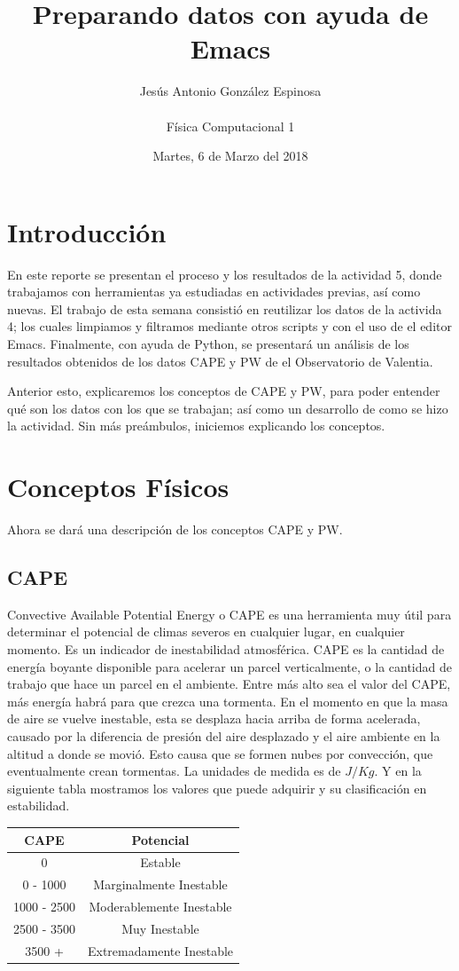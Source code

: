 \documentclass[a4paper]{article}
\title{Preparando datos con ayuda de Emacs}
\author{Jesús Antonio González Espinosa \\ \\ Física Computacional 1}
\date{Martes, 6 de Marzo del 2018}
\begin{document}
\maketitle

\section{Introducción}
En este reporte se presentan el proceso y los resultados de la actividad 5, donde trabajamos con herramientas ya estudiadas en actividades previas, así como nuevas. El trabajo de esta semana consistió en reutilizar los datos de la activida 4; los cuales limpiamos y filtramos mediante otros scripts y con el uso de el editor Emacs. Finalmente, con ayuda de Python, se presentará un análisis de los resultados obtenidos de los datos CAPE y PW de el Observatorio de Valentia.

Anterior  esto, explicaremos los conceptos de CAPE y PW, para poder entender qué son los datos con los que se trabajan; así como un desarrollo de como se hizo la actividad. Sin más preámbulos, iniciemos explicando los conceptos.


\section{Conceptos Físicos}
Ahora se dará una descripción de los conceptos CAPE y PW.

\subsection{CAPE}
Convective Available Potential Energy o CAPE es una herramienta muy útil para determinar el potencial de climas severos en cualquier lugar, en cualquier momento. Es un indicador de inestabilidad atmosférica. 
CAPE es la cantidad de energía boyante disponible para acelerar un parcel verticalmente, o la cantidad de trabajo que hace un parcel en el ambiente. Entre más alto sea el valor del CAPE, más energía habrá para que crezca una tormenta. En el momento en que la masa de aire se vuelve inestable, esta se desplaza hacia arriba de forma acelerada, causado por la diferencia de presión del aire desplazado y el aire ambiente en la altitud a donde se movió. Esto causa que se formen nubes por convección, que eventualmente crean tormentas. 
La unidades de medida es de $J/Kg$. Y en la siguiente tabla mostramos los valores que puede adquirir y su clasificación en estabilidad.
\begin{center}
 \begin{tabular}{||c | c||} 
 \hline
 CAPE & Potencial  \\ [0.5ex] 
 \hline\hline
 0 & Estable \\ 
 \hline
 0 - 1000 & Marginalmente Inestable \\
 \hline
 1000 - 2500 & Moderablemente Inestable \\
 \hline
 2500 - 3500 & Muy Inestable \\
 \hline
 3500 +  & Extremadamente Inestable \\ [1ex] 
 \hline
\end{tabular}
\end{center}
\end{document}
